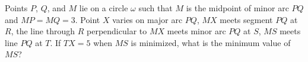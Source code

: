 Points $P$, $Q$, and $M$ lie on a circle $\omega$ such that $M$ is the midpoint of minor arc $PQ$ and $MP=MQ=3$. Point $X$ varies on major arc $PQ$, $MX$ meets segment $PQ$ at $R$, the line through $R$ perpendicular to $MX$ meets minor arc $PQ$ at $S$, $MS$ meets line $PQ$ at $T$. If $TX=5$ when $MS$ is minimized, what is the minimum value of $MS$?